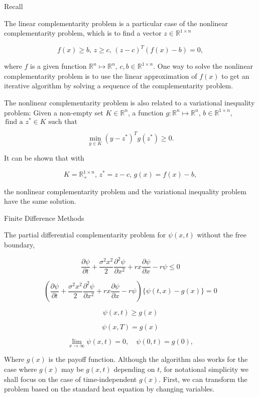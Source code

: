 \documentclass{beamer}
\begin{document}
\begin{frame}{Recall}

    {\footnotesize \footnotesize
     The linear complementarity problem is a particular case of the nonlinear complementarity problem, which is to find a vector \( z \in \mathbb{R}^{1 \times n} \)

\[
f(x) \geq b, \, z \geq c, \, (z - c)^T(f(x) - b) = 0,
\]

where \( f \) is a given function \( \mathbb{R}^n \longmapsto \mathbb{R}^n, \, c, b \in \mathbb{R}^{1 \times n} \). 
One way to solve the nonlinear complementarity problem is to use the linear approximation of \( f(x) \) to get
an iterative algorithm by solving a sequence of the complementarity problem.

\vspace{1em}
The nonlinear complementarity problem is also related to a variational inequality problem: 
Given a non-empty set \( K \in \mathbb{R}^n \), a function $g: \mathbb{R}^n \longmapsto \mathbb{R}^n, \, b \in \mathbb{R}^{1 \times n},$
\(  \, \text{find a } 
z^* \in K \text{ such that} \)

\[
\min_{y \in K}(y - z^*)^T g(z^*) \geq 0.
\]

It can be shown that with

\[
K = \mathbb{R}_+^{1 \times n}, \, z^* = z - c, \, g(x) = f(x) - b,
\]

the nonlinear complementarity problem and the variational inequality problem have the same solution.

    }
    
\end{frame}


\begin{frame}{Finite Difference Methods}

    {\footnotesize \footnotesize
    The partial differential complementarity problem for \(\psi(x,t)\) without the free boundary,

    \[
    \frac{\partial \psi}{\partial t} + \frac{\sigma^2 x^2}{2} \frac{\partial^2 \psi}{\partial x^2} + rx \frac{\partial \psi}{\partial x} - r\psi \leq 0
    \]

    \[
    \left( \frac{\partial \psi}{\partial t} + \frac{\sigma^2 x^2}{2} \frac{\partial^2 \psi}{\partial x^2} + rx \frac{\partial \psi}{\partial x} - r\psi \right) \{ \psi(t,x) - g(x) \} = 0
    \]

    \[
    \psi(x,t) \geq g(x)
    \]

    \[
    \psi(x,T) = g(x)
    \]

    \[
    \lim_{x \to \infty} \psi(x,t) = 0, \quad \psi(0,t) = g(0),
    \]

   Where $g(x)$ is the payoff function. Although the algorithm also works for the case where $g(x)$ may be $g(x,t)$ depending on $t$,
    for notational simplicity we shall focus on the case of time-independent $g(x)$. 
    First, we can transform the problem based on the standard heat equation by changing variables. 

        }
    
\end{frame}
\end{document}
